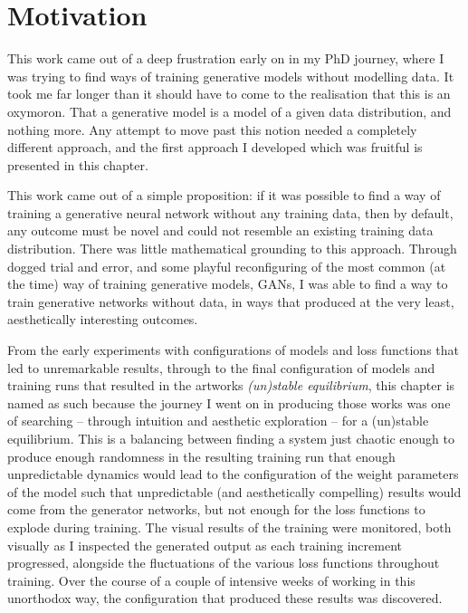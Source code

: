 \section{Motivation}

This work came out of a deep frustration early on in my PhD journey, where I was trying to find ways of training generative models without modelling data.
It took me far longer than it should have to come to the realisation that this is an oxymoron. 
That a generative model is a model of a given data distribution, and nothing more. 
Any attempt to move past this notion needed a completely different approach, and the first approach I developed which was fruitful is presented in this chapter. 

This work came out of a simple proposition: if it was possible to find a way of training a generative neural network without any training data, then by default, any outcome must be novel and could not resemble an existing training data distribution. 
There was little mathematical grounding to this approach. 
Through dogged trial and error, and some playful reconfiguring of the most common (at the time) way of training generative models, GANs, I was able to find a way to train generative networks without data, in ways that produced at the very least, aesthetically interesting outcomes. 

From the early experiments with configurations of models and loss functions that led to unremarkable results, through to the final configuration of models and training runs that resulted in the artworks \textit{(un)stable equilibrium}, this chapter is named as such because the journey I went on in producing those works was one of searching -- through intuition and aesthetic exploration -- for a (un)stable equilibrium. 
This is a balancing between finding a system just chaotic enough to produce enough randomness in the resulting training run that enough unpredictable dynamics would lead to the configuration of the weight parameters of the model such that unpredictable (and aesthetically compelling) results would come from the generator networks, but not enough for the loss functions to explode during training. 
The visual results of the training were monitored, both visually as I inspected the generated output as each training increment progressed, alongside the fluctuations of the various loss functions throughout training. 
Over the course of a couple of intensive weeks of working in this unorthodox way, the configuration that produced these results was discovered. 

